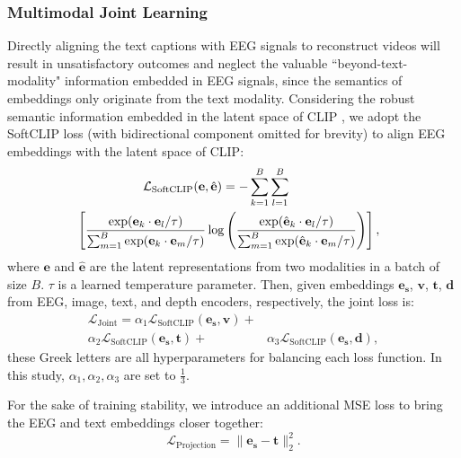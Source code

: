 \documentclass{article}
\begin{document}
\subsubsection{Multimodal Joint Learning}
Directly aligning the text captions with EEG signals to reconstruct videos will result in unsatisfactory outcomes and neglect the valuable ``beyond-text-modality" information embedded in EEG signals, since the semantics of embeddings only originate from the text modality. 
Considering the robust semantic information embedded in the latent space of CLIP \cite{lu2024animate, gao2020sketchycoco}, we adopt the SoftCLIP loss \cite{gao2024softclip} (with bidirectional component omitted for brevity) to align EEG embeddings with the latent space of CLIP:
\begin{equation}
\begin{aligned}
    \hspace{5.5em}\mathcal{L}_{\text{SoftCLIP}}(\mathbf{e}, \hat{\mathbf{e}}) =  - \sum_{k=1}^{B} \sum_{l=1}^{B}  \\ 
    & \hspace{-17em} \left[ \frac{\exp(\mathbf{e}_k \cdot \mathbf{e}_l/\tau) } {\sum_{m=1}^{B} \exp(\mathbf{e}_k \cdot \mathbf{e}_m / \tau)} \log \left( \frac{\exp(\hat{\mathbf{e}}_k \cdot \mathbf{e}_l / \tau) }{\sum_{m=1}^{B} \exp(\hat{\mathbf{e}}_k \cdot \mathbf{e}_m / \tau)} \right) \right],
\end{aligned}
\end{equation}
where $\mathbf{e}$ and $\hat{\mathbf{e}}$ are the latent representations from two modalities in a batch of size $B$. $\tau$ is a learned temperature parameter. Then, given embeddings $\mathbf{e_s}$, $\mathbf{v}$, $\mathbf{t}$, $\mathbf{d}$ from EEG, image, text, and depth encoders, respectively, the joint loss is:
\begin{equation}
\begin{aligned}
    \mathcal{L}_{\text{Joint}} = 
    \alpha_{1}\mathcal{L}_{\text{SoftCLIP}}(\mathbf{e_s}, \mathbf{v}) +  \\ \alpha_{2}\mathcal{L}_{\text{SoftCLIP}}(\mathbf{e_s}, \mathbf{t}) + &\alpha_{3}\mathcal{L}_{\text{SoftCLIP}}(\mathbf{e_s}, \mathbf{d}),
\end{aligned}
\end{equation}
these Greek letters are all hyperparameters for balancing each loss function. In this study, $\alpha_{1},\alpha_{2},\alpha_{3}$ are set to $\frac{1}{3}$.

For the sake of training stability,  we introduce an additional MSE loss to bring the EEG and text embeddings closer together:
\begin{equation}
    \mathcal{L}_{\text{Projection}} = \| \mathbf{e_s} - \mathbf{t} \|_2^2.
\end{equation}
\end{document}
